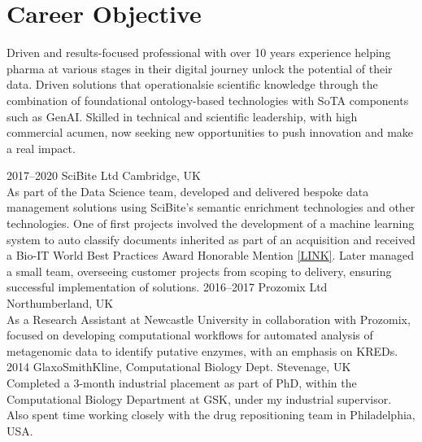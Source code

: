\documentclass[print]{cv-style}          %
\begin{document}
\section{Career Objective}
\vspace{-0.3cm}
Driven and results-focused professional with over 10 years experience helping pharma at various stages in their digital journey unlock the potential of their data. Driven solutions that operationalsie scientific knowledge through the combination of foundational ontology-based technologies with SoTA components such as GenAI. Skilled in technical and scientific leadership, with high commercial acumen, now seeking new opportunities to push innovation and make a real impact.


\begin{entrylist}
\entry
  {2017--2020}
  {SciBite Ltd}
  {Cambridge, UK}
  {\\
  As part of the Data Science team, developed and delivered bespoke data management solutions using SciBite's semantic enrichment technologies and other technologies. One of first projects involved the development of a machine learning system to auto classify documents inherited as part of an acquisition and received a Bio-IT World Best Practices Award Honorable Mention \href{https://www.bio-itworld.com/news/2018/08/08/a-new-machine-learning-approach-to-document-classification-a-pfizer-scibite-collaboration}{[LINK]}. Later managed a small team, overseeing customer projects from scoping to delivery, ensuring successful implementation of solutions.} 
\entry
  {2016--2017}
  {Prozomix Ltd}
  {Northumberland, UK}
  {\\
  As a Research Assistant at Newcastle University in collaboration with Prozomix, focused on developing computational workflows for automated analysis of metagenomic data to identify putative enzymes, with an emphasis on KREDs.} 
\entry
  {2014}
  {GlaxoSmithKline, Computational Biology Dept.}
  {Stevenage, UK}
  {\\ 
  Completed a 3-month industrial placement as part of PhD, within the Computational Biology Department at GSK, under my industrial supervisor. Also spent time working closely with the drug repositioning team in Philadelphia, USA.} 
\end{entrylist}
\end{document}
